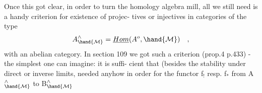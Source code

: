 Once this got clear, in order to turn the homology algebra
mill, all we still need is a handy criterion for existence of  projec-%
tives or injectives in categories of the type
\[ A^{\wedge}_{\hand{\mathcal{M}}} = \underline{Hom}(A^o, \hand{\mathcal{M}}) \quad , \]
with  an abelian category. In section 109 we got such a criterion
(prop.4 p.433) - the simplest one can imagine: it is  suffi-%
cient that (besides the stability under direct or inverse limits,
needed anyhow in order for the functor f$_{!}$ resp. f$_*$ from A$^{\wedge}_{\hand{\mathcal{M}}}$ to B$^{\wedge}_{\hand{\mathcal{M}}}$


